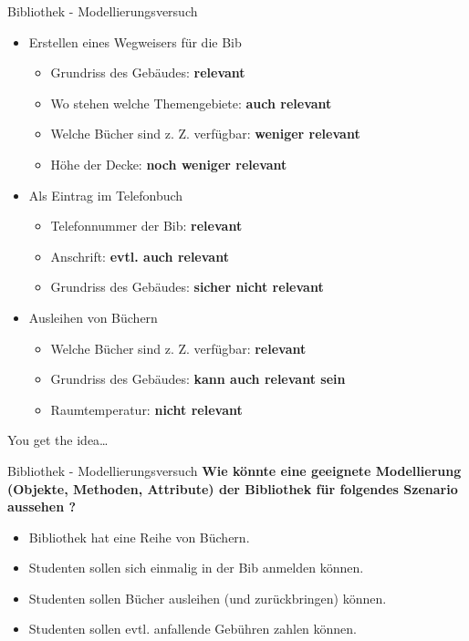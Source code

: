 \documentclass[18pt]{beamer}
\begin{document}
\begin{frame}{Bibliothek - Modellierungsversuch}
    \begin{itemize}
        \item Erstellen eines Wegweisers für die Bib
        \begin{itemize}
            \item Grundriss des Gebäudes: \textbf{relevant}
            \item Wo stehen welche Themengebiete: \textbf{auch relevant}
            \item Welche Bücher sind z. Z. verfügbar: \textbf{weniger relevant}
            \item Höhe der Decke: \textbf{noch weniger relevant}
        \end{itemize}
        \pause
        \item Als Eintrag im Telefonbuch
        \begin{itemize}
            \item Telefonnummer der Bib: \textbf{relevant}
            \item Anschrift: \textbf{evtl. auch relevant}
            \item Grundriss des Gebäudes: \textbf{sicher nicht relevant}
        \end{itemize}
        \pause
        \item Ausleihen von Büchern
        \begin{itemize}
            \item Welche Bücher sind z. Z. verfügbar: \textbf{relevant}
            \item Grundriss des Gebäudes: \textbf{kann auch relevant sein}
            \item Raumtemperatur: \textbf{nicht relevant}
        \end{itemize}
    \end{itemize}
    You get the idea\dots
\end{frame}

\begin{frame}{Bibliothek - Modellierungsversuch}
    \textbf{Wie könnte eine geeignete Modellierung (Objekte, Methoden, Attribute) der \textbf{Bibliothek} für folgendes Szenario aussehen ?}
    \begin{itemize}
        \item Bibliothek hat eine Reihe von Büchern.
        \item Studenten sollen sich einmalig in der Bib anmelden können.
        \item Studenten sollen Bücher ausleihen (und zurückbringen) können.
        \item Studenten sollen evtl. anfallende Gebühren zahlen können.
    \end{itemize}
\end{frame}
\end{document}
